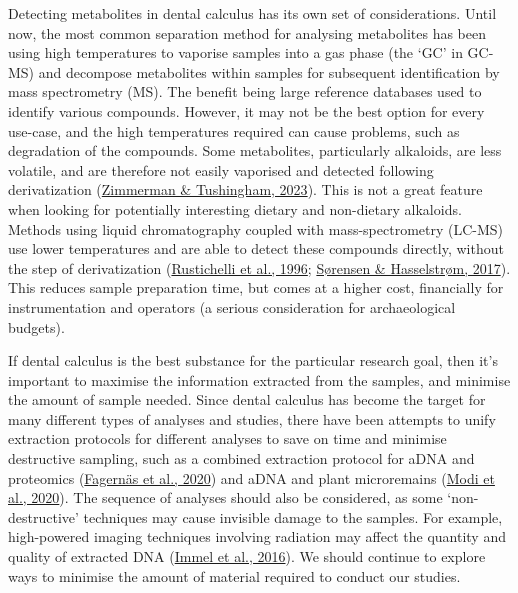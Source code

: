 \documentclass[
  letterpaper,
]{book}
\begin{document}
Detecting metabolites in dental calculus has its own set of
considerations. Until now, the most common separation method for
analysing metabolites has been using high temperatures to vaporise
samples into a gas phase (the `GC' in GC-MS) and decompose metabolites
within samples for subsequent identification by mass spectrometry (MS).
The benefit being large reference databases used to identify various
compounds. However, it may not be the best option for every use-case,
and the high temperatures required can cause problems, such as
degradation of the compounds. Some metabolites, particularly alkaloids,
are less volatile, and are therefore not easily vaporised and detected
following derivatization
(\protect\hyperlink{ref-zimmermanBiomolecularArchaeology2023}{Zimmerman
\& Tushingham, 2023}). This is not a great feature when looking for
potentially interesting dietary and non-dietary alkaloids. Methods using
liquid chromatography coupled with mass-spectrometry (LC-MS) use lower
temperatures and are able to detect these compounds directly, without
the step of derivatization
(\protect\hyperlink{ref-rustichelliSimultaneousSeparation1996}{Rustichelli
et al., 1996};
\protect\hyperlink{ref-sorensenSensitiveDetermination2017}{Sørensen \&
Hasselstrøm, 2017}). This reduces sample preparation time, but comes at
a higher cost, financially for instrumentation and operators (a serious
consideration for archaeological budgets).

If dental calculus is the best substance for the particular research
goal, then it's important to maximise the information extracted from the
samples, and minimise the amount of sample needed. Since dental calculus
has become the target for many different types of analyses and studies,
there have been attempts to unify extraction protocols for different
analyses to save on time and minimise destructive sampling, such as a
combined extraction protocol for aDNA and proteomics
(\protect\hyperlink{ref-fagernasUnifiedProtocol2020}{Fagernäs et al.,
2020}) and aDNA and plant microremains
(\protect\hyperlink{ref-modiCalculusMethodologies2020}{Modi et al.,
2020}). The sequence of analyses should also be considered, as some
`non-destructive' techniques may cause invisible damage to the samples.
For example, high-powered imaging techniques involving radiation may
affect the quantity and quality of extracted DNA
(\protect\hyperlink{ref-immelEffectXray2016}{Immel et al., 2016}). We
should continue to explore ways to minimise the amount of material
required to conduct our studies.
\end{document}
